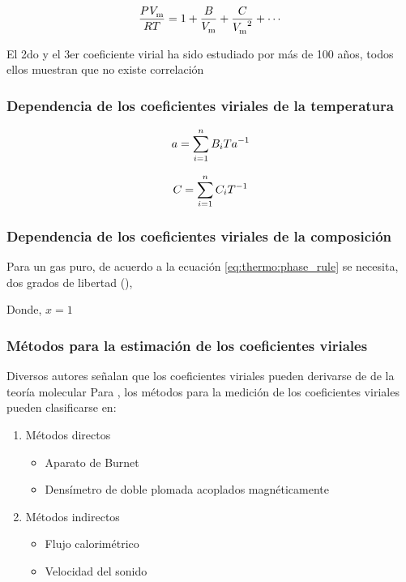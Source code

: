     \begin{equation}
      \eqVirialForVDevelop{}
    \end{equation}
    \eqVirialForVDevelopNaming
    
    El 2do y el 3er coeficiente virial ha sido estudiado por más de 100 años, todos ellos muestran que no existe correlación \parencite{thirdVirialTing}



  
\subsubsection*{Dependencia de los coeficientes viriales de la temperatura}
    \begin{equation}
      a = \sum_{i=1}^{n} B_{i} Ta^{-1}{}
    \end{equation}
    
    \begin{equation}
      C_{} = \sum_{i=1}^{n} C_{i} T^{-1}{}
    \end{equation}

\subsubsection*{Dependencia de los coeficientes viriales de la composición}
    Para un gas puro, de acuerdo a la ecuación \eqref{eq:thermo:phase_rule} se necesita, dos grados de libertad (\freeDegree),  

    Donde, $x = 1$ 

\subsubsection{Métodos para la estimación de los coeficientes viriales}
    Diversos autores señalan que los coeficientes viriales pueden derivarse de \parencite[p. 4.13]{Poling2001} de la teoría molecular
    Para \parencite{Trusler10.1039/9781782627043-00152}, los métodos para la medición de los coeficientes viriales pueden clasificarse en:

    \begin{enumerate}[label=(\alph*)]
      \item Métodos directos
        \begin{itemize}
          \item Aparato de Burnet
          \item Densímetro de doble plomada acoplados magnéticamente
        \end{itemize}
      \item  Métodos indirectos
        \begin{itemize}
          \item Flujo calorimétrico
          \item Velocidad del sonido
        \end{itemize}
    \end{enumerate}

